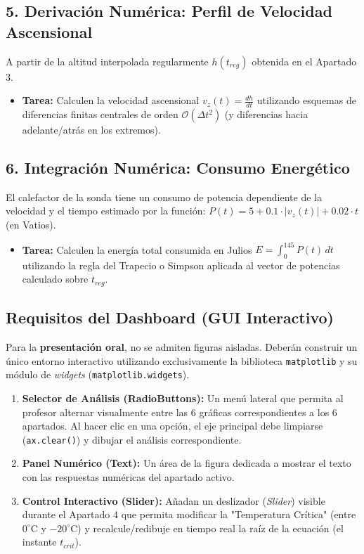 	\subsection*{5. Derivación Numérica: Perfil de Velocidad Ascensional}
	
	A partir de la altitud interpolada regularmente $h(t_{reg})$ obtenida en el Apartado 3.
	
	\begin{itemize}
		\item \textbf{Tarea:} Calculen la velocidad ascensional $v_z(t) = \frac{dh}{dt}$ utilizando esquemas de diferencias finitas centrales de orden $\mathcal{O}(\Delta t^2)$ (y diferencias hacia adelante/atrás en los extremos).
	\end{itemize}
	
	\subsection*{6. Integración Numérica: Consumo Energético}
	
	El calefactor de la sonda tiene un consumo de potencia dependiente de la velocidad y el tiempo estimado por la función: $P(t) = 5 + 0.1 \cdot |v_z(t)| + 0.02 \cdot t$ (en Vatios).
	
	\begin{itemize}
		\item \textbf{Tarea:} Calculen la energía total consumida en Julios $E = \int_{0}^{145} P(t) \, dt$ utilizando la regla del Trapecio o Simpson aplicada al vector de potencias calculado sobre $t_{reg}$.
	\end{itemize}
	
	\subsection*{Requisitos del Dashboard (GUI Interactivo)}
	
	Para la \textbf{presentación oral}, no se admiten figuras aisladas. Deberán construir un único entorno interactivo utilizando exclusivamente la biblioteca \texttt{matplotlib} y su módulo de \textit{widgets} (\texttt{matplotlib.widgets}).
	
	\begin{enumerate}
		\item \textbf{Selector de Análisis (RadioButtons):} Un menú lateral que permita al profesor alternar visualmente entre las 6 gráficas correspondientes a los 6 apartados. Al hacer clic en una opción, el eje principal debe limpiarse (\texttt{ax.clear()}) y dibujar el análisis correspondiente.
		\item \textbf{Panel Numérico (Text):} 
		Un área de la figura dedicada a mostrar el texto con las 
		respuestas numéricas del apartado activo. 
	
		\item \textbf{Control Interactivo (Slider):} Añadan un deslizador (\textit{Slider}) visible durante el Apartado 4 que permita modificar la "Temperatura Crítica" (entre $0^\circ \text{C}$ y $-20^\circ \text{C}$) y recalcule/redibuje en tiempo real la raíz de la ecuación (el instante $t_{crit}$).
	\end{enumerate}
	
